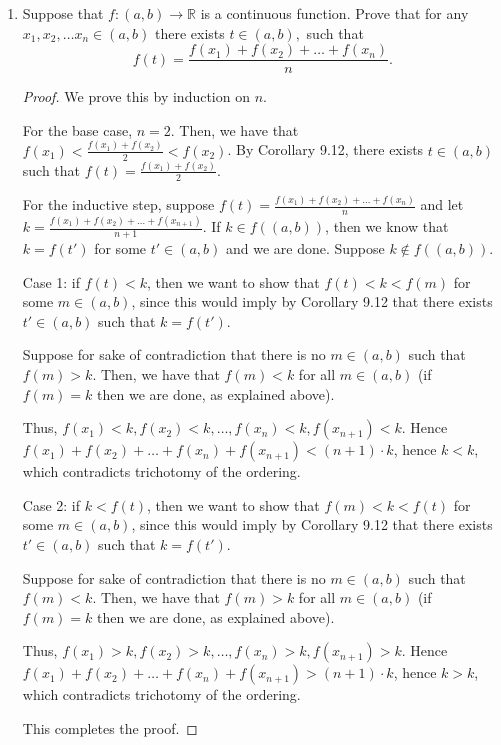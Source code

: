 \documentclass[11pt]{article}
\renewcommand{\_}[1]{\underline{ #1 }}
\theoremstyle{definition}
\numberwithin{equation}{subsection}
\begin{document}
\begin{enumerate}
\begin{enumerate}
\begin{proof}
\renewcommand\qedsymbol{QED}
\end{proof}


    
\end{enumerate}




\item
Suppose that $f: (a,b) \longrightarrow \mathbb{R}$ is a continuous function. Prove that for any $x_1, x_2, \ldots x_n \in (a,b)$ there exists $t \in (a,b),$ such that
$$
f(t) = \frac{f(x_1)+f(x_2)+ \ldots +f(x_n)}{n}.
$$ 


\begin{proof}
We prove this by induction on $n$.

For the base case, $n=2$. Then, we have that $f(x_1)<\frac{f(x_1)+f(x_2)}{2}<f(x_2)$. By Corollary 9.12, there exists $t\in (a,b)$ such that $f(t)=\frac{f(x_1)+f(x_2)}{2}$.

For the inductive step, suppose $f(t)=\frac{f(x_1)+f(x_2)+ \ldots +f(x_n)}{n}$ and let $k = \frac{f(x_1)+f(x_2)+ \ldots +f(x_{n+1})}{n+1}$. If $k \in f((a,b))$, then we know that $k=f(t')$ for some $t' \in (a,b)$ and we are done. Suppose $k \notin f((a,b))$. 

Case 1: if $f(t)<k$, then we want to show that $f(t)<k<f(m)$ for some $m \in (a,b)$, since this would imply by Corollary 9.12 that there exists $t' \in (a,b)$ such that $k=f(t')$. 

Suppose for sake of contradiction that there is no $m \in (a,b)$ such that $f(m)>k$. Then, we have that $f(m)<k$ for all $m \in (a,b)$ (if $f(m)=k$ then we are done, as explained above).

Thus, $f(x_1)<k, f(x_2)<k, \dots, f(x_n)<k, f(x_{n+1})<k$. Hence $f(x_1)+f(x_2)+\dots + f(x_n)+f(x_{n+1})<(n+1)\cdot k$, hence $k<k$, which contradicts trichotomy of the ordering. 

Case 2: if $k<f(t)$, then we want to show that $f(m)<k<f(t)$ for some $m \in (a,b)$, since this would imply by Corollary 9.12 that there exists $t' \in (a,b)$ such that $k=f(t')$.

Suppose for sake of contradiction that there is no $m \in (a,b)$ such that $f(m)<k$. Then, we have that $f(m)>k$ for all $m \in (a,b)$ (if $f(m)=k$ then we are done, as explained above).

Thus, $f(x_1)>k, f(x_2)>k, \dots, f(x_n)>k, f(x_{n+1})>k$. Hence $f(x_1)+f(x_2)+\dots + f(x_n)+f(x_{n+1})>(n+1)\cdot k$, hence $k>k$, which contradicts trichotomy of the ordering. 

This completes the proof. 

\renewcommand\qedsymbol{QED}
\end{proof}



\end{enumerate}
\end{document}
